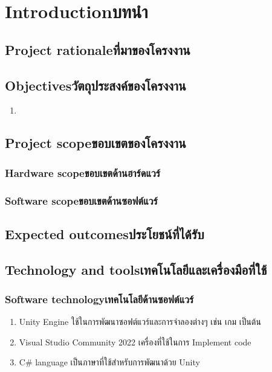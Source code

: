 \chapter{\ifenglish Introduction\else บทนำ\fi}

\section{\ifenglish Project rationale\else ที่มาของโครงงาน\fi}

\section{\ifenglish Objectives\else วัตถุประสงค์ของโครงงาน\fi}
\begin{enumerate}
    \item 
\end{enumerate}

\section{\ifenglish Project scope\else ขอบเขตของโครงงาน\fi}

\subsection{\ifenglish Hardware scope\else ขอบเขตด้านฮาร์ดแวร์\fi}

\subsection{\ifenglish Software scope\else ขอบเขตด้านซอฟต์แวร์\fi}

\section{\ifenglish Expected outcomes\else ประโยชน์ที่ได้รับ\fi}

\section{\ifenglish Technology and tools\else เทคโนโลยีและเครื่องมือที่ใช้\fi}


\subsection{\ifenglish Software technology\else เทคโนโลยีด้านซอฟต์แวร์\fi}
\begin{enumerate}
    \item Unity Engine ใช้ในการพัฒนาซอฟต์แวร์และการจำลองต่างๆ เช่น เกม เป็นต้น
    \item Visual Studio Community 2022 เครื่องที่ใช้ในการ Implement code
    \item C# language เป็นภาษาที่ใช้สำหรับการพัฒนาด้วย Unity
\end{enumerate}

